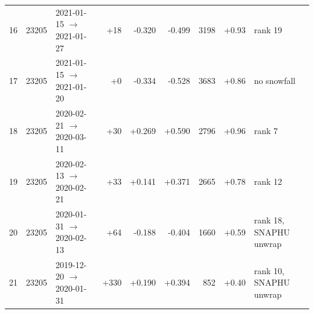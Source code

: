\begin{tabular}{cllrrrrrl}
16 & 23205 & 2021-01-15 $\rightarrow$ 2021-01-27 & +18 & -0.320 & -0.499 & 3198 & +0.93 & rank 19 \\
17 & 23205 & 2021-01-15 $\rightarrow$ 2021-01-20 & +0 & -0.334 & -0.528 & 3683 & +0.86 & no snowfall \\
18 & 23205 & 2020-02-21 $\rightarrow$ 2020-03-11 & +30 & +0.269 & +0.590 & 2796 & +0.96 & rank 7 \\
19 & 23205 & 2020-02-13 $\rightarrow$ 2020-02-21 & +33 & +0.141 & +0.371 & 2665 & +0.78 & rank 12 \\
20 & 23205 & 2020-01-31 $\rightarrow$ 2020-02-13 & +64 & -0.188 & -0.404 & 1660 & +0.59 & rank 18, SNAPHU unwrap \\
21 & 23205 & 2019-12-20 $\rightarrow$ 2020-01-31 & +330 & +0.190 & +0.394 & 852 & +0.40 & rank 10, SNAPHU unwrap \\
\hline
\end{tabular}
